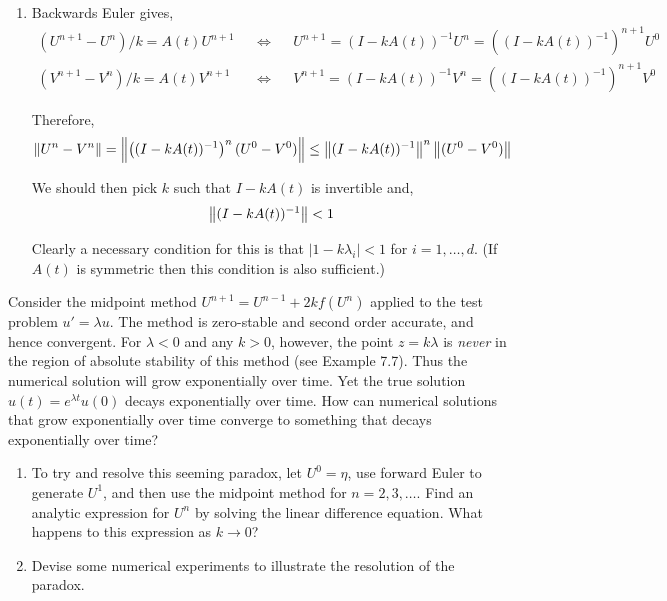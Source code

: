 \documentclass[10pt]{article}
\begin{document}
\begin{solution}[Solution]
\begin{enumerate}[label=(\alph*)]
    \item %
    Backwards Euler gives,
    \begin{align*}
        (U^{n+1}-U^n)/k = A(t)U^{n+1} && \Longleftrightarrow &&
        U^{n+1} = (I-kA(t))^{-1} U^n = \left((I-kA(t))^{-1}\right)^{n+1}U^0 \\
        (V^{n+1}-V^n)/k = A(t)V^{n+1} && \Longleftrightarrow &&
        V^{n+1} = (I-kA(t))^{-1} V^n = \left((I-kA(t))^{-1}\right)^{n+1}V^0
    \end{align*}

    Therefore,
    \begin{align*}
        \left\lVert U^n - V^n\right\rVert = \left\lVert\left((I-kA(t))^{-1} \right)^{n} (U^0-V^0)\right\rVert \leq \left\lVert(I-kA(t))^{-1} \right\rVert^{n} \left\lVert(U^0-V^0)\right\rVert
    \end{align*}

    We should then pick \( k \) such that \( I-kA(t) \) is invertible and,
    \begin{align*}
        \left\lVert(I-kA(t))^{-1}\right\rVert < 1
    \end{align*}

    Clearly a necessary condition for this is that \( |1-k\lambda_i| < 1 \) for \( i=1,\ldots, d \). (If \( A(t) \) is symmetric then this condition is also sufficient.)


\end{enumerate}

\end{solution}

\begin{problem}[Problem 2]
Consider the midpoint method \(U^{n+1} = U^{n-1} + 2k f( U^n )\) applied to the test problem \(u' = \lambda u\). The method is zero-stable and second order accurate, and hence convergent.  For \(\lambda < 0\) and any \(k > 0\),
however, the point \(z = k \lambda\) is {\em never} in the region of absolute stability of this method (see Example 7.7).  Thus the numerical solution will grow exponentially over time.  Yet the true solution \(u(t) = e^{\lambda t} u(0)\) decays exponentially over time.  How can numerical solutions that grow exponentially over time converge to something that decays exponentially over time?
\begin{enumerate}[label=(\alph*)]
\item To try and resolve this seeming paradox, let \(U^0 = \eta\), use forward Euler to generate \(U^1\), and then use the midpoint method for \(n=2,3, \ldots\).  Find an analytic expression for \(U^n\) by solving the linear difference equation.  What happens to this expression as \(k \rightarrow 0\)?
\item Devise some numerical experiments to illustrate the resolution of the paradox.
\end{enumerate}
\end{problem}
\end{document}
